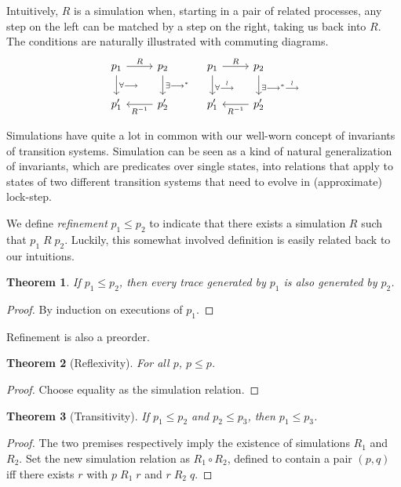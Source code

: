 \documentclass{amsbook}
\newtheorem{theorem}{Theorem}[chapter]
\theoremstyle{definition}
\theoremstyle{remark}
\numberwithin{section}{chapter}
\numberwithin{equation}{chapter}
\begin{document}
Intuitively, $R$ is a simulation when, starting in a pair of related processes, any step on the left can be matched by a step on the right, taking us back into $R$.
The conditions are naturally illustrated with commuting diagrams.
\[
\begin{tikzcd}
p_1 \arrow{r}{R} \arrow{d}{\forall \longrightarrow} & p_2 \arrow{d}{\exists \longrightarrow^*} \\
p'_1 & p'_2 \arrow{l}{R^{-1}}
\end{tikzcd}
\quad \begin{tikzcd}
p_1 \arrow{r}{R} \arrow{d}{\forall \stackrel{l}{\longrightarrow}} & p_2 \arrow{d}{\exists \longrightarrow^* \stackrel{l}{\longrightarrow}} \\
p'_1 & p'_2 \arrow{l}{R^{-1}}
\end{tikzcd}
\]

\newcommand{\refines}[2]{#1 \leq #2}

\invariants
Simulations have quite a lot in common with our well-worn concept of invariants of transition systems.
Simulation can be seen as a kind of natural generalization of invariants, which are predicates over single states, into relations that apply to states of two different transition systems that need to evolve in (approximate) lock-step.

We define \emph{refinement} $\refines{p_1}{p_2}$ to indicate that there exists a simulation $R$ such that $p_1 \; R \; p_2$.
Luckily, this somewhat involved definition is easily related back to our intuitions.

\begin{theorem}
  If $\refines{p_1}{p_2}$, then every trace generated by $p_1$ is also generated by $p_2$.
\end{theorem}
\begin{proof}
  By induction on executions of $p_1$.
\end{proof}

Refinement is also a preorder.

\begin{theorem}[Reflexivity]
  For all $p$, $\refines{p}{p}$.
\end{theorem}
\begin{proof}
  Choose equality as the simulation relation.
\end{proof}

\begin{theorem}[Transitivity]
  If $\refines{p_1}{p_2}$ and $\refines{p_2}{p_3}$, then $\refines{p_1}{p_3}$.
\end{theorem}
\begin{proof}
  The two premises respectively imply the existence of simulations $R_1$ and $R_2$.
  Set the new simulation relation as $R_1 \circ R_2$, defined to contain a pair $(p, q)$ iff there exists $r$ with $p \; R_1 \; r$ and $r \; R_2 \; q$.
\end{proof}
\end{document}
